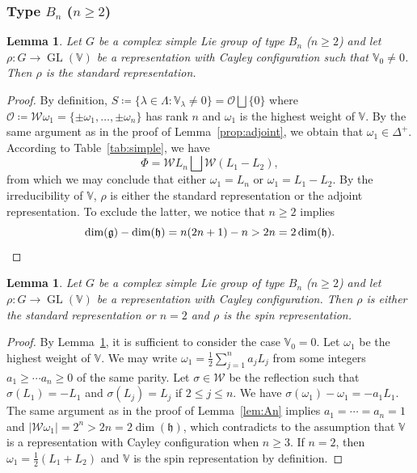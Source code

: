 \documentclass[11pt,reqno]{amsart}
\DeclareMathOperator{\GL}{GL}
\newtheorem{lemma}[theorem]{Lemma}
\newcommand{\W}{\mathcal{W}}
\begin{document}
\subsubsection{Type $B_n$ ($n \ge 2$)}
\begin{lemma}\label{lem:adjointBn}
Let $G$ be a complex simple Lie group of type $B_n$ ($n\ge 2$) and let $\rho: G \to \GL(\mathbb{V})$ be a representation with Cayley configuration such that $\mathbb{V}_0 \ne 0$.  Then $\rho$ is the standard representation.
\end{lemma}
\begin{proof}
By definition,  $S \coloneqq \{\lambda \in \Lambda: \mathbb{V}_{\lambda} \ne 0 \} = \mathcal{O} \bigsqcup \{0\}$ where $\mathcal{O} \coloneqq \W \omega_1 = \{\pm \omega_1,\dots,  \pm \omega_n\}$ has rank $n$ and $\omega_1$ is the highest weight of $\mathbb{V}$.  By the same argument as in the proof of Lemma~\ref{prop:adjoint},  we obtain that $\omega_1 \in \Delta^+$.  According to Table~\ref{tab:simple},  we have \[
\Phi = \W L_n \bigsqcup \W ( L_1 - L_2),
\]
from which we may conclude that either $\omega_1 =  L_n$ or $\omega_1 =  L_1 - L_2$.  By the irreducibility of $\mathbb{V}$,  $\rho$ is either the standard representation or the adjoint representation.  To exclude the latter,  we notice that $n \ge 2$ implies
\[ 
\dim (\mathfrak{g}) - \dim (\mathfrak{h}) = n(2n+1) - n  > 2n =  2\dim (\mathfrak{h}).  \qedhere
\]
\end{proof}
\begin{lemma}\label{lem:Bn}
Let $G$ be a complex simple Lie group of type $B_n$ ($n\ge 2$) and let $\rho: G \to \GL(\mathbb{V})$ be a representation with Cayley configuration.  Then $\rho$ is either the standard representation or $n = 2$ and $\rho$ is the spin representation.
\end{lemma}
\begin{proof}
By Lemma~\ref{lem:adjointBn},  it is sufficient to consider the case $\mathbb{V}_0 = 0$.  Let $\omega_1$ be the highest weight of $\mathbb{V}$.  We may write $\omega_1 = \frac{1}{2} \sum_{j=1}^n a_j L_j $ from some integers $a_1 \ge \cdots a_n \ge 0$ of the same parity.  Let $\sigma \in \W$ be the reflection such that $\sigma(L_1) = -L_1$ and $\sigma(L_j) = L_j$ if $2 \le j \le n$.  We have $\sigma (\omega_1) - \omega_1 = -a_1 L_1$.  The same argument as in the proof of Lemma~\ref{lem:An} implies $a_1 = \cdots = a_n = 1$ and $|\W \omega_1| = 2^n >  2n = 2 \dim (\mathfrak{h})$,  which contradicts to the assumption that $\mathbb{V}$ is a representation with Cayley configuration when $n \ge 3$.  If $n = 2$,  then $\omega_1 = \frac{1}{2}( L_1 + L_2 )$ and $\mathbb{V}$ is the spin representation by definition.
\end{proof}    
\end{document}
